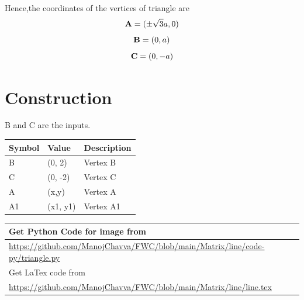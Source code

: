 \documentclass[journal,12pt,twocolumn]{IEEEtran}
\let\vec\mathbf
\begin{document}
\noindent Hence,the coordinates of the vertices of triangle are 
\begin{equation*}						
\vec{A} = (\pm\sqrt{3}a,0)\\
\end{equation*}
\begin{equation*}						
\vec{B} = (0,a)\\
\end{equation*}
\begin{equation*}						
\vec{C} = (0,-a)\\
\end{equation*}



\section{Construction}
B and C are the inputs.
\begin{table}[h]
\centering
\large
\begin{tabular}{|l|l|l|}
\hline
\textbf{Symbol} & \textbf{Value} & \textbf{Description} \\ \hline
B               & (0, 2)         & Vertex B             \\ \hline
C               & (0, -2)        & Vertex C             \\ \hline
A               & (x,y)          & Vertex A             \\ \hline
A1              & (x1, y1)       & Vertex A1            \\ \hline
\end{tabular}
\end{table}

\begin{table}[h]
\large
\begin{tabular}{lll}
\multicolumn{3}{l}{Get Python Code for image from}                                                 \\ \hline
\multicolumn{3}{|l|}{\url{https://github.com/ManojChavva/FWC/blob/main/Matrix/line/code-py/triangle.py}} \\ 
 \hline
\multicolumn{3}{l}{Get LaTex code from}                                                            \\ \hline
\multicolumn{3}{|l|}{\url{https://github.com/ManojChavva/FWC/blob/main/Matrix/line/line.tex}}            \\ \hline
\end{tabular}
\end{table}
\end{document}
